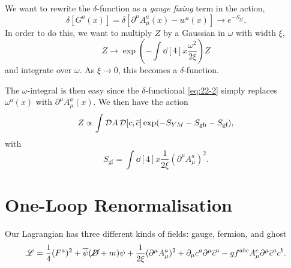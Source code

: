 We want to rewrite the $\delta$-function as a \emph{gauge fixing} term in the action,
\begin{equation}
  \label{eq:22-2}
  \delta[G^{a}(x)] = \delta[\partial^{\mu} A_{\mu}^{a}(x) - w^{a}(x)] \to e^{-S_{\text{gf}}}.
\end{equation}
In order to do this, we want to multiply $Z$ by a Gaussian in $\omega$ with width $\xi$,
\begin{equation}
  Z \to \exp(-\int \dd[4]{x} \frac{\omega^2}{2 \xi}) Z
\end{equation}
and integrate over $\omega$. As $\xi \to 0$, this becomes a $\delta$-function.

The $\omega$-integral is then easy since the $\delta$-functional \eqref{eq:22-2} simply replaces $\omega^{a}(x)$ with $\partial^{\mu} A_{\mu}^{a}(x)$.
We then have the action
\begin{equation}
  Z \propto \int \mathop{\mathcal{D} A} \mathop{\mathcal{D} [c, \overline{c}{}]} \exp(-S_{YM} - S_{\text{gh}} - S_{\text{gf}}),
\end{equation}
with
\begin{equation}
  \label{eq:22-gf}
  S_{\text{gf}} = \int \dd[4]{x} \frac{1}{2 \xi} (\partial^{\mu} A_{\mu}^{a})^2.
\end{equation}

\section{One-Loop Renormalisation}%
\label{sec:one_loop_renormalisation}

Our Lagrangian has three different kinds of fields: gauge, fermion, and ghost
\begin{equation}
  \mathscr{L} = \frac{1}{4} (F^{a})^2 + \overline{\psi}{} (\cancel{D} + m) \psi + \frac{1}{2 \xi} (\partial^{\mu} A_{\mu}^{a}) ^2 + \partial_{\mu} c^{a} \partial^{\mu} \overline{c}{}^{a} - g f^{abc} A_{\mu}^{c} \partial^{\mu} \overline{c}{}^{a} c^{b}.
\end{equation}

